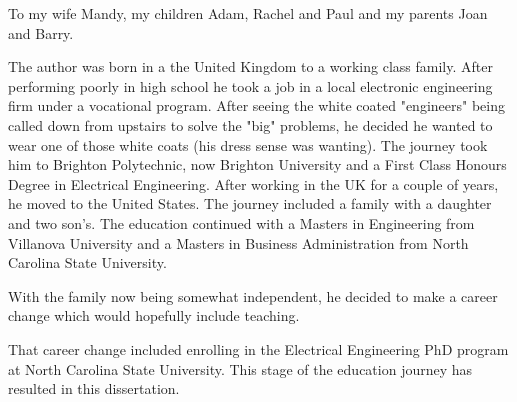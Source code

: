 \maketitlepage

\begin{dedication}
 \centering To my wife Mandy, my children Adam, Rachel and Paul and my parents Joan and Barry.
\end{dedication}

\begin{biography}
The author was born in a the United Kingdom to a working class family.  After performing poorly in high school he took a job in a local electronic engineering firm
under a vocational program.
After seeing the white coated "engineers" being called down from upstairs to solve the "big" problems, he decided he wanted to wear one
of those white coats (his dress sense was wanting).
The journey took him to Brighton Polytechnic, now Brighton University and a First Class Honours Degree in Electrical Engineering.
After working in the UK for a couple of years, he moved to the United States.
The journey included a family with a daughter and two son's.
The education continued with a Masters in Engineering from Villanova University and a Masters in Business Administration from North
Carolina State University.

With the family now being somewhat independent, he decided to make a career change which would hopefully include teaching.

That career change included enrolling in the Electrical Engineering PhD program at North
Carolina State University. This stage of the education journey has resulted in this dissertation.




\end{biography}
